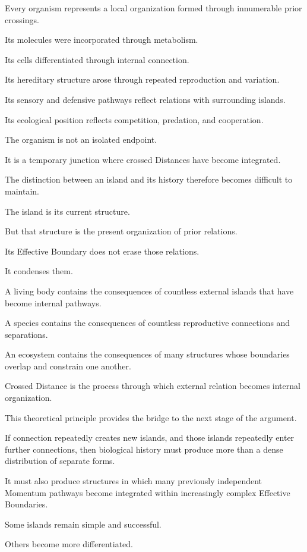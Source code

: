 Every organism represents a local organization formed through innumerable prior crossings.

Its molecules were incorporated through metabolism.

Its cells differentiated through internal connection.

Its hereditary structure arose through repeated reproduction and variation.

Its sensory and defensive pathways reflect relations with surrounding islands.

Its ecological position reflects competition, predation, and cooperation.

The organism is not an isolated endpoint.

It is a temporary junction where crossed Distances have become integrated.

The distinction between an island and its history therefore becomes difficult to maintain.

The island is its current structure.

But that structure is the present organization of prior relations.

Its Effective Boundary does not erase those relations.

It condenses them.

A living body contains the consequences of countless external islands that have become internal pathways.

A species contains the consequences of countless reproductive connections and separations.

An ecosystem contains the consequences of many structures whose boundaries overlap and constrain one another.

Crossed Distance is the process through which external relation becomes internal organization.

This theoretical principle provides the bridge to the next stage of the argument.

If connection repeatedly creates new islands, and those islands repeatedly enter further connections, then biological history must produce more than a dense distribution of separate forms.

It must also produce structures in which many previously independent Momentum pathways become integrated within increasingly complex Effective Boundaries.

Some islands remain simple and successful.

Others become more differentiated.

